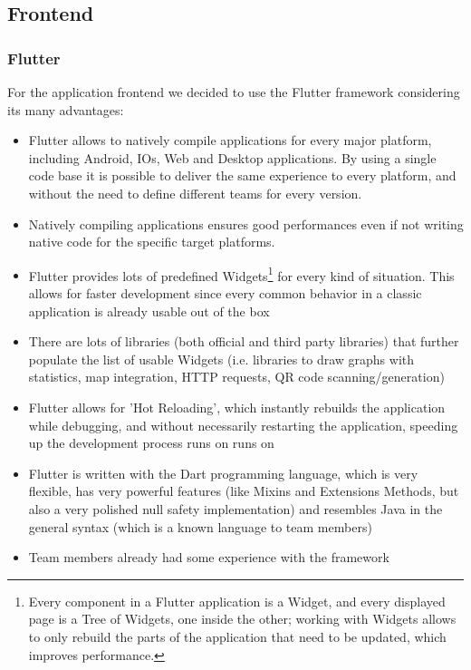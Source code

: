 \subsection{Frontend}
\subsubsection{Flutter}

For the application frontend we decided to use the Flutter framework considering its many advantages:
\begin{itemize}
    \item Flutter allows to natively compile applications for every major platform, including Android, IOs, Web and Desktop applications. By using a single code base it is possible to deliver the same experience to every platform, and without the need to define different teams for every version.
    \item Natively compiling applications ensures good performances even if not writing native code for the specific target platforms.
    \item Flutter provides lots of predefined Widgets\footnote{Every component in a Flutter application is a Widget, and every displayed page is a Tree of Widgets, one inside the other; working with Widgets allows to only rebuild the parts of the application that need to be updated, which improves performance.} for every kind of situation. This allows for faster development since every common behavior in a classic application is already usable out of the box
    \item There are lots of libraries (both official and third party libraries) that further populate the list of usable Widgets (i.e. libraries to draw graphs with statistics, map integration, HTTP requests, QR code scanning/generation)
    \item Flutter allows for 'Hot Reloading', which instantly rebuilds the application while debugging, and without necessarily restarting the application, speeding up the development process runs on runs on
    \item Flutter is written with the Dart programming language, which is very flexible, has very powerful features (like Mixins and Extensions Methods, but also a very polished null safety implementation) and resembles Java in the general syntax (which is a known language to team members)
    \item Team members already had some experience with the framework
\end{itemize}

